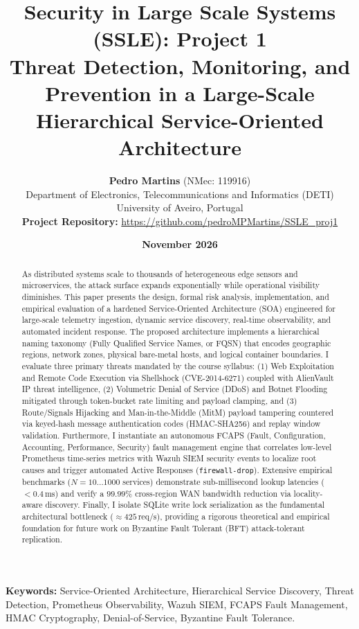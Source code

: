 \documentclass[11pt,a4paper]{article}
\title{\textbf{\Large Security in Large Scale Systems (SSLE): Project 1}\\[0.5em]
\Large\textbf{Threat Detection, Monitoring, and Prevention in a Large-Scale Hierarchical Service-Oriented Architecture}}
\author{\textbf{Pedro Martins} (NMec: 119916)\\
Department of Electronics, Telecommunications and Informatics (DETI)\\
University of Aveiro, Portugal\\[0.3em]
\small\textbf{Project Repository:} \url{https://github.com/pedroMPMartins/SSLE_proj1}}
\date{\textbf{November 2026}}
\begin{document}
\maketitle

\begin{abstract}
As distributed systems scale to thousands of heterogeneous edge sensors and microservices, the attack surface expands exponentially while operational visibility diminishes. This paper presents the design, formal risk analysis, implementation, and empirical evaluation of a hardened Service-Oriented Architecture (SOA) engineered for large-scale telemetry ingestion, dynamic service discovery, real-time observability, and automated incident response. The proposed architecture implements a hierarchical naming taxonomy (Fully Qualified Service Names, or FQSN) that encodes geographic regions, network zones, physical bare-metal hosts, and logical container boundaries. I evaluate three primary threats mandated by the course syllabus: (1) Web Exploitation and Remote Code Execution via Shellshock (CVE-2014-6271) coupled with AlienVault IP threat intelligence, (2) Volumetric Denial of Service (DDoS) and Botnet Flooding mitigated through token-bucket rate limiting and payload clamping, and (3) Route/Signals Hijacking and Man-in-the-Middle (MitM) payload tampering countered via keyed-hash message authentication codes (HMAC-SHA256) and replay window validation. Furthermore, I instantiate an autonomous FCAPS (Fault, Configuration, Accounting, Performance, Security) fault management engine that correlates low-level Prometheus time-series metrics with Wazuh SIEM security events to localize root causes and trigger automated Active Responses (\texttt{firewall-drop}). Extensive empirical benchmarks ($N = 10 \dots 1000$ services) demonstrate sub-millisecond lookup latencies ($<0.4\,\text{ms}$) and verify a $99.99\%$ cross-region WAN bandwidth reduction via locality-aware discovery. Finally, I isolate SQLite write lock serialization as the fundamental architectural bottleneck ($\approx 425\,\text{req/s}$), providing a rigorous theoretical and empirical foundation for future work on Byzantine Fault Tolerant (BFT) attack-tolerant replication.
\end{abstract}

\vspace{1em}
\noindent\textbf{Keywords:} Service-Oriented Architecture, Hierarchical Service Discovery, Threat Detection, Prometheus Observability, Wazuh SIEM, FCAPS Fault Management, HMAC Cryptography, Denial-of-Service, Byzantine Fault Tolerance.

\newpage
{
  \hypersetup{linkcolor=black}
  \tableofcontents
}
\newpage












\end{document}
